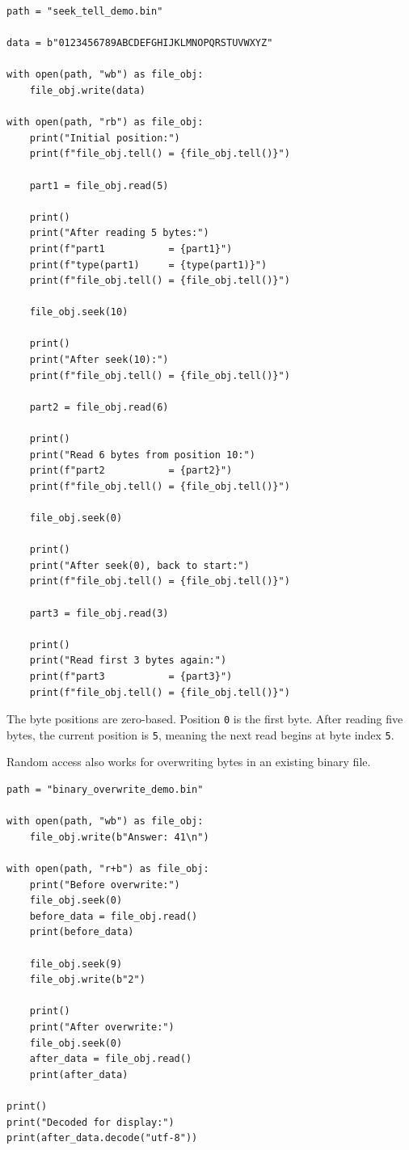 \begin{verbatim}
path = "seek_tell_demo.bin"

data = b"0123456789ABCDEFGHIJKLMNOPQRSTUVWXYZ"

with open(path, "wb") as file_obj:
    file_obj.write(data)

with open(path, "rb") as file_obj:
    print("Initial position:")
    print(f"file_obj.tell() = {file_obj.tell()}")

    part1 = file_obj.read(5)

    print()
    print("After reading 5 bytes:")
    print(f"part1           = {part1}")
    print(f"type(part1)     = {type(part1)}")
    print(f"file_obj.tell() = {file_obj.tell()}")

    file_obj.seek(10)

    print()
    print("After seek(10):")
    print(f"file_obj.tell() = {file_obj.tell()}")

    part2 = file_obj.read(6)

    print()
    print("Read 6 bytes from position 10:")
    print(f"part2           = {part2}")
    print(f"file_obj.tell() = {file_obj.tell()}")

    file_obj.seek(0)

    print()
    print("After seek(0), back to start:")
    print(f"file_obj.tell() = {file_obj.tell()}")

    part3 = file_obj.read(3)

    print()
    print("Read first 3 bytes again:")
    print(f"part3           = {part3}")
    print(f"file_obj.tell() = {file_obj.tell()}")
\end{verbatim}

The byte positions are zero-based. Position \texttt{0} is the first byte. After reading five bytes, the current position is \texttt{5}, meaning the next read begins at byte index \texttt{5}.

Random access also works for overwriting bytes in an existing binary file.

\begin{verbatim}
path = "binary_overwrite_demo.bin"

with open(path, "wb") as file_obj:
    file_obj.write(b"Answer: 41\n")

with open(path, "r+b") as file_obj:
    print("Before overwrite:")
    file_obj.seek(0)
    before_data = file_obj.read()
    print(before_data)

    file_obj.seek(9)
    file_obj.write(b"2")

    print()
    print("After overwrite:")
    file_obj.seek(0)
    after_data = file_obj.read()
    print(after_data)

print()
print("Decoded for display:")
print(after_data.decode("utf-8"))
\end{verbatim}

